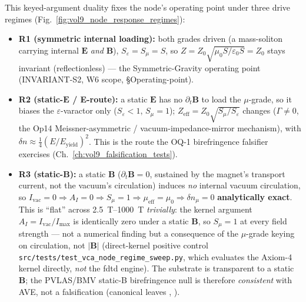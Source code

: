 This keyed-argument duality fixes the node's operating point under three drive regimes (Fig.~\ref{fig:vol9_node_response_regimes}):



\begin{itemize}
    \item \textbf{R1 (symmetric internal loading):} both grades driven (a mass-soliton carrying internal $\mathbf E$ \emph{and} $\mathbf B$), $S_\varepsilon = S_\mu = S$, so $Z = Z_0\sqrt{\mu_0 S/\varepsilon_0 S} = Z_0$ stays invariant (reflectionless) --- the Symmetric-Gravity operating point (INVARIANT-S2, W6 scope,  \S Operating-point).
    \item \textbf{R2 (static-$\mathbf E$ / E-route):} a static $\mathbf E$ has no $\partial_t\mathbf B$ to load the $\mu$-grade, so it biases the $\varepsilon$-varactor only ($S_\varepsilon < 1$, $S_\mu = 1$); $Z_{\mathrm{eff}} = Z_0\sqrt{S_\mu/S_\varepsilon}$ changes ($\Gamma \neq 0$, the Op14 Meissner-asymmetric / vacuum-impedance-mirror mechanism), with $\delta n \approx \tfrac14 (E/E_{\mathrm{yield}})^2$. This is the route the OQ-1 birefringence falsifier exercises (Ch.~\ref{ch:vol9_falsification_tests}).
    \item \textbf{R3 (static-$\mathbf B$):} a static $\mathbf B$ ($\partial_t\mathbf B = 0$, sustained by the magnet's transport current, not the vacuum's circulation) induces \emph{no} internal vacuum circulation, so $I_{\mathrm{vac}} = 0 \Rightarrow A_I = 0 \Rightarrow S_\mu = 1 \Rightarrow \mu_{\mathrm{eff}} = \mu_0 \Rightarrow \delta n_\mu = 0$ \textbf{analytically exact}. This is ``flat'' across \qtyrange{2.5}{1000}{\tesla} \emph{trivially}: the kernel argument $A_I = I_{\mathrm{vac}}/I_{\mathrm{max}}$ is identically zero under a static $\mathbf B$, so $S_\mu = 1$ at every field strength --- not a numerical finding but a consequence of the $\mu$-grade keying on circulation, not $|\mathbf B|$ (direct-kernel positive control \texttt{src/tests/test\_vca\_node\_regime\_sweep.py}, which evaluates the Axiom-4 kernel directly, \emph{not} the fdtd engine). The substrate is transparent to a static $\mathbf B$; the PVLAS/BMV static-B birefringence null is therefore \emph{consistent} with AVE, not a falsification (canonical leaves , ).
\end{itemize}

